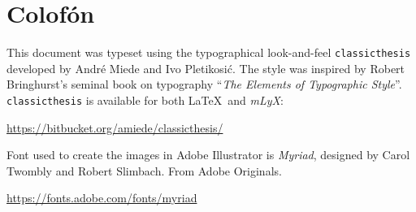 \pagestyle{empty}

\hfill

\vfill


\section*{Colofón}
This document was typeset using the typographical look-and-feel \texttt{classicthesis} developed by Andr\'e Miede and Ivo Pletikosić.
The style was inspired by Robert Bringhurst's seminal book on typography ``\emph{The Elements of Typographic Style}''.
\texttt{classicthesis} is available for both \LaTeX\ and \textit{mLyX}:
\begin{center}
\url{https://bitbucket.org/amiede/classicthesis/}
\end{center}

Font used to create the images in Adobe Illustrator is \textit{Myriad}, designed by Carol Twombly and Robert Slimbach. From Adobe Originals.
\begin{center}
    \url{https://fonts.adobe.com/fonts/myriad}
\end{center}

\bigskip

\noindent